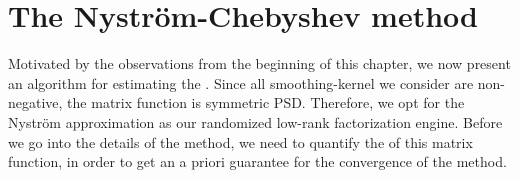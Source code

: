 
\section{The Nystr\"om-Chebyshev method}
\label{sec:3-nystrom-nystrom-chebyshev}

Motivated by the observations from the beginning of this chapter, we now present
an algorithm for estimating the .
Since all \gls{smoothing-kernel} we consider are non-negative, the matrix
function  is symmetric \gls{PSD}.
Therefore, we opt for the Nystr\"om approximation 
as our randomized low-rank factorization engine. Before we go into the details
of the method, we need to quantify the  of this matrix
function, in order to get an a priori guarantee for the convergence of the 
method.\\

